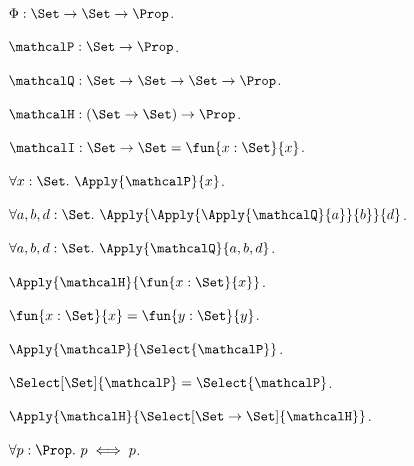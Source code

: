 \begin{signature}\label{typed_phi}
    $\Phi : \Set\to\Set\to\Prop$.
\end{signature}

\begin{signature}\label{typed_predicate}
    $\mathcalP : \Set\to\Prop$.
\end{signature}

\begin{signature}\label{typed_curried_predicate}
    $\mathcalQ : \Set\to\Set\to\Set\to\Prop$.
\end{signature}

\begin{signature}\label{typed_function_predicate}
    $\mathcalH : (\Set\to\Set)\to\Prop$.
\end{signature}

\begin{definition}\label{typed_identity}
    $\mathcalI : \Set\to\Set = \fun{x:\Set}{x}$.
\end{definition}

\begin{axiom}\label{typed_application}
    $\forall x:\Set.\ \Apply{\mathcalP}{x}$.
\end{axiom}

\begin{axiom}\label{typed_nested_application}
    $\forall a,b,d:\Set.\ \Apply{\Apply{\Apply{\mathcalQ}{a}}{b}}{d}$.
\end{axiom}

\begin{axiom}\label{typed_compact_application}
    $\forall a,b,d:\Set.\ \Apply{\mathcalQ}{a,b,d}$.
\end{axiom}

\begin{axiom}\label{typed_lambda_application}
    $\Apply{\mathcalH}{\fun{x:\Set}{x}}$.
\end{axiom}

\begin{axiom}\label{typed_function_equality}
    $\fun{x:\Set}{x} = \fun{y:\Set}{y}$.
\end{axiom}

\begin{axiom}\label{typed_select_inferred}
    $\Apply{\mathcalP}{\Select{\mathcalP}}$.
\end{axiom}

\begin{axiom}\label{typed_select_explicit}
    $\Select[\Set]{\mathcalP} = \Select{\mathcalP}$.
\end{axiom}

\begin{axiom}\label{typed_select_function}
    $\Apply{\mathcalH}{\Select[\Set\to\Set]{\mathcalH}}$.
\end{axiom}

\begin{axiom}\label{typed_proposition_quantifier}
    $\forall p:\Prop.\ p \iff p$.
\end{axiom}
